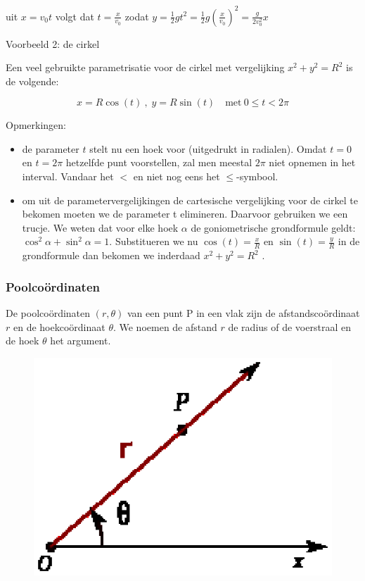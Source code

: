 uit $x=v_{0}t$ volgt dat $t=\frac{x}{v_{0}}$ zodat $y=\frac{1}{2}gt^{2}=\frac{1}{2}g\left(\frac{x}{v_{0}}\right)^{2}=\frac{g}{2v_{0}^{2}}x$


\noindent Voorbeeld 2: de cirkel

Een veel gebruikte parametrisatie voor de cirkel met vergelijking
$x^{2}+y^{2}=R^{2}$ is de volgende:

\noindent 
\[
x=R\cos(t)\:,\;y=R\sin(t)\quad\textrm{met}\:0\leq t<2\pi
\]


Opmerkingen:
\begin{itemize}
\item de parameter $t$ stelt nu een hoek voor (uitgedrukt in radialen).
Omdat $t=0$ en $t=2\pi$ hetzelfde punt voorstellen, zal men meestal
$2\pi$ niet opnemen in het interval. Vandaar het $<$ en niet nog
eens het $\leq$-symbool.
\item om uit de parametervergelijkingen de cartesische vergelijking voor
de cirkel te bekomen moeten we de parameter t elimineren. Daarvoor
gebruiken we een trucje. We weten dat voor elke hoek $\alpha$ de
goniometrische grondformule geldt: $\cos^{2}\alpha+\sin^{2}\alpha=1$.
Substitueren we nu $\cos(t)=\frac{x}{R}$ en $\sin(t)=\frac{y}{R}$
in de grondformule dan bekomen we inderdaad $x^{2}+y^{2}=R^{2}$ .
\end{itemize}

\subsubsection{Poolco\"ordinaten}

De poolco\"ordinaten $\left(r,\theta\right)$ van een punt P in een
vlak zijn de afstandsco\"ordinaat $r$ en de hoekco\"ordinaat $\theta$.
We noemen de afstand $r$ de radius of de voerstraal en de hoek $\theta$
het argument.

\begin{figure}
\centering
\includegraphics{2_elem_rekenvaardigheden_B/inputs/Poolcoordinaten_wikipedia}
\end{figure}

